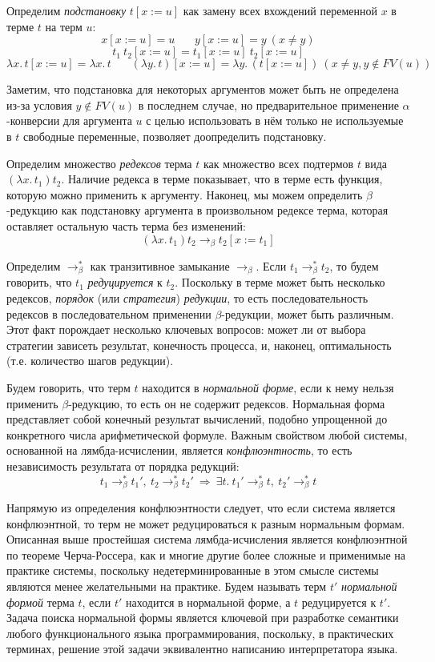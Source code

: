 \documentclass[../diploma.tex]{subfiles}
\begin{document}
Определим \textit{подстановку} $t [x := u]$ как замену всех вхождений переменной $x$ в терме $t$ на терм $u$:
$$x [x := u] = u\ \ \ \ \ \ \ \ y [x := u] = y\ (x \neq y)$$ $$t_1\ t_2 [x := u] = t_1 [x := u]\ t_2 [x := u]$$ $$\lambda x.\, t [x := u] = \lambda x.\, t \ \ \ \ \ \ \ \ (\lambda y.\, t) [x := u] = \lambda y.\, (t [x := u])\ (x \neq y, y \notin FV(u))$$

Заметим, что подстановка для некоторых аргументов может быть не определена из-за условия $y \notin FV(u)$ в последнем случае, но предварительное применение $\alpha$-конверсии для аргумента $u$ с целью использовать в нём только не используемые в $t$ свободные переменные, позволяет доопределить подстановку.

Определим множество \textit{редексов} терма $t$ как множество всех подтермов $t$ вида $(\lambda x.\, t_1) t_2$. Наличие редекса в терме показывает, что в терме есть функция, которую можно применить к аргументу. Наконец, мы можем определить $\beta$-редукцию как подстановку аргумента в произвольном редексе терма, которая оставляет остальную часть терма без изменений:
$$(\lambda x.\, t_1) t_2 \rightarrow_\beta t_2 [x := t_1]$$

Определим $\rightarrow_\beta^*$ как транзитивное замыкание $\rightarrow_\beta$. Если $t_1 \rightarrow_\beta^* t_2$, то будем говорить, что $t_1$ \textit{редуцируется} к $t_2$. Поскольку в терме может быть несколько редексов, \textit{порядок} (или \textit{стратегия}) \textit{редукции}, то есть последовательность редексов в последовательном применении $\beta$-редукции, может быть различным. Этот факт порождает несколько ключевых вопросов: может ли от выбора стратегии зависеть результат, конечность процесса, и, наконец, оптимальность (т.е. количество шагов редукции).

Будем говорить, что терм $t$ находится в \textit{нормальной форме}, если к нему нельзя применить $\beta$-редукцию, то есть он не содержит редексов. Нормальная форма представляет собой конечный результат вычислений, подобно упрощенной до конкретного числа арифметической формуле. Важным свойством любой системы, основанной на лямбда-исчислении, является \textit{конфлюэнтность}, то есть независимость результата от порядка редукций:
$$t_1 \rightarrow_\beta^* t_1',\ t_2 \rightarrow_\beta^* t_2' \ \Rightarrow\ \exists t.\ t_1' \rightarrow_\beta^* t,\ t_2' \rightarrow_\beta^* t$$

Напрямую из определения конфлюэнтности следует, что если система является конфлюэнтной, то терм не может редуцироваться к разным нормальным формам. Описанная выше простейшая система лямбда-исчисления является конфлюэнтной по теореме Черча-Россера, как и многие другие более сложные и применимые на практике системы, поскольку недетерминированные в этом смысле системы являются менее желательными на практике. Будем называть терм $t'$ \textit{нормальной формой} терма $t$, если $t'$ находится в нормальной форме, а $t$ редуцируется к $t'$. Задача поиска нормальной формы является ключевой при разработке семантики любого функционального языка программирования, поскольку, в практических терминах, решение этой задачи эквивалентно написанию интерпретатора языка. 
\end{document}
